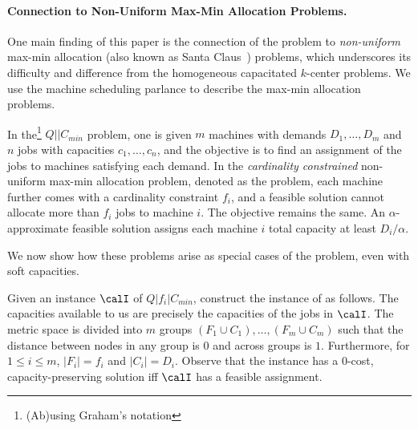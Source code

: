 \paragraph{Connection to Non-Uniform Max-Min Allocation Problems.}
One main finding of this paper is the connection of the \mckc problem to {\em non-uniform} max-min allocation (also known as Santa Claus~\cite{BansalS06}) problems, which
 underscores its difficulty and difference from  the homogeneous capacitated $k$-center problems. %
We use the machine scheduling parlance to describe the max-min allocation problems.

\begin{definition}
In the\footnote{(Ab)using Graham's notation} $Q||C_{min}$ problem, one is given $m$ machines with demands $D_1,\ldots,D_m$ and $n$ jobs with capacities $c_1,\ldots,c_n$,
and the objective is to find an assignment of the jobs to machines satisfying each demand.
In the {\em cardinality constrained}  non-uniform max-min allocation problem, denoted as the \cckp problem, each machine further comes with a cardinality constraint $f_i$, and a feasible solution cannot allocate more than $f_i$ jobs to machine $i$. The objective remains the same. An $\alpha$-approximate feasible solution assigns each machine $i$  total capacity at least $ D_i/\alpha$.
\end{definition}
\noindent
We now show how these problems arise as special cases
of the \mckc problem, even with soft capacities.
\begin{remark}\label{rem:cckp}
	Given an instance $\calI$ of $Q|f_i|C_{min}$, construct the instance of \mckc as follows. The capacities available to us are precisely the capacities of the jobs in $\calI$.
	The metric space is divided into $m$ groups $(F_1\cup C_1),\ldots,(F_m\cup C_m)$ such that the distance between nodes in any group is $0$ and across groups is $1$.
	Furthermore, for $1\leq i\leq m$, $|F_i| = f_i$ and $|C_i| = D_i$. Observe that the \mckc instance has a $0$-cost, capacity-preserving solution iff $\calI$ has a feasible assignment.
\end{remark}
